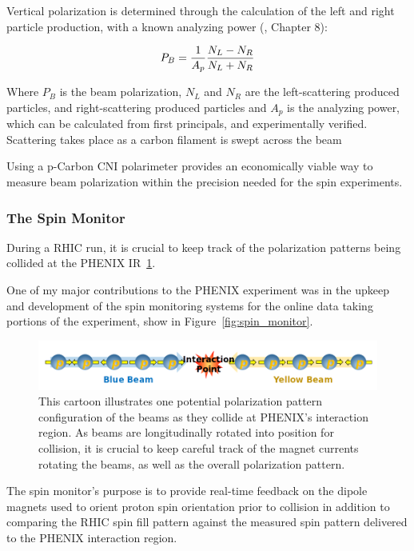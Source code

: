 Vertical polarization is determined through the calculation of the left and
right particle production, with a known analyzing power (\cite{RHIC2006},
Chapter 8):

\begin{equation}
  P_B = {{1}\over{A_p}}{{N_L-N_R}\over{N_L+N_R}}
  \label{eq:rhic_polarization}
\end{equation}

{\noindent}Where $P_B$ is the beam polarization, $N_L$ and $N_R$ are the
left-scattering produced particles, and right-scattering produced particles and
$A_p$ is the analyzing power, which can be calculated from first principals, and
experimentally verified. Scattering takes place as a carbon filament is swept
across the beam

Using a p-Carbon CNI polarimeter provides an economically viable way to measure
beam polarization within the precision needed for the spin experiments.

\subsubsection{The Spin Monitor}
\label{sec:the_spin_monitor}

During a RHIC run, it is crucial to keep track of the polarization patterns
being collided at the PHENIX IR~\ref{fig:phenix_spin_collision}. 

One of my major contributions to the PHENIX experiment was in the upkeep and
development of the spin monitoring systems for the online data taking portions
of the experiment, show in Figure~\ref{fig:spin_monitor}.


\begin{figure}
  \centering
  \includegraphics[width=\linewidth]{./figures/phenix_spin_collision}
  \caption{
    This cartoon illustrates one potential polarization pattern configuration
    of the beams as they collide at PHENIX's interaction region.  As beams are
    longitudinally rotated into position for collision, it is crucial to keep
    careful track of the magnet currents rotating the beams, as well as the
    overall polarization pattern.
  }
  \label{fig:phenix_spin_collision}
\end{figure}

The spin monitor's purpose is to provide real-time feedback on the dipole
magnets used to orient proton spin orientation prior to collision in addition to
comparing the RHIC spin fill pattern against the measured spin pattern delivered
to the PHENIX interaction region. 

